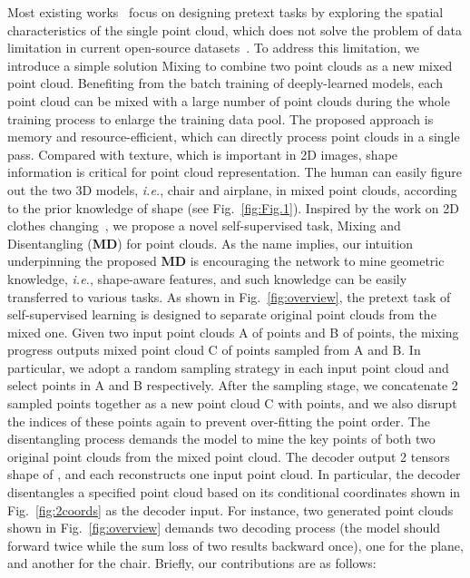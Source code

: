 \documentclass[journal]{IEEEtran}
\def\ie{\emph{i.e.}}
\begin{document}
Most existing works~\cite{sauder2019self, xie2020pointcontrast} focus on designing pretext tasks by exploring the spatial characteristics of the single point cloud, which does not solve the problem of data limitation in current open-source datasets~\cite{wu20153d, yi2016scalable}. 
To address this limitation, we introduce a simple solution Mixing to combine two point clouds as a new mixed point cloud.
Benefiting from the batch training of deeply-learned models, each point cloud can be mixed with a large number of point clouds during the whole training process to enlarge the training data pool. The proposed approach is memory and resource-efficient, which can directly process point clouds in a single pass.
Compared with texture, which is important in 2D images, shape information is critical for point cloud representation. The human can easily figure out the two 3D models, \ie, chair and airplane, in mixed point clouds, according to the prior knowledge of shape (see Fig.~\ref{fig:Fig.1}). 
Inspired by the work on 2D clothes changing~\cite{zheng2019joint}, we propose a novel self-supervised task, Mixing and Disentangling (\textbf{MD}) for point clouds. 
As the name implies, our intuition underpinning the proposed \textbf{MD} is encouraging the network to mine geometric knowledge, \ie, shape-aware features, and such knowledge can be easily transferred to various tasks. 
As shown in Fig.~\ref{fig:overview}, the pretext task of self-supervised learning is designed to separate original point clouds from the mixed one.
Given two input point clouds A of  points and B of  points, the mixing progress outputs mixed point cloud C of  points sampled from A and B. In particular, we adopt a random sampling strategy in each input point cloud and select  points in A and B respectively. After the sampling stage, we concatenate 2 sampled  points together as a new point cloud C with  points, and we also disrupt the indices of these points again to prevent over-fitting the point order.
The disentangling process demands the model to mine the key points of both two original point clouds from the mixed point cloud.
The decoder output 2 tensors shape of , and each reconstructs one input point cloud. In particular, the decoder disentangles a specified point cloud based on its conditional coordinates shown in Fig.~\ref{fig:2coords} as the decoder input. For instance, two generated point clouds shown in Fig.~\ref{fig:overview} demands two decoding process (the model should forward twice while the sum loss of two results backward once), one for the plane, and another for the chair.
Briefly, our contributions are as follows: 
\end{document}
